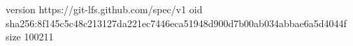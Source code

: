 version https://git-lfs.github.com/spec/v1
oid sha256:8f145c5c48c213127da221ec7446eca51948d900d7b00ab034abbae6a5d4044f
size 100211
